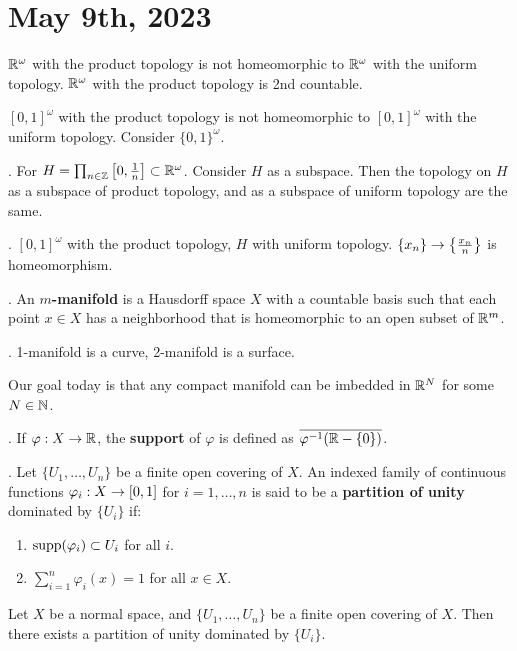 \section*{May 9th, 2023}

\rmk \(\mathbb{R}^\omega\) with the product topology is not homeomorphic to \(\mathbb{R}^\omega\) with the uniform topology. \(\mathbb{R}^\omega\) with the product topology is 2nd countable.

\([0, 1]^\omega\) with the product topology is not homeomorphic to \([0, 1]^\omega\) with the uniform topology. Consider \(\{0, 1\}^\omega\).

\claim. For \(H = \prod_{n \in \mathbb{Z}} \left[0, \frac{1}{n}\right] \subset \mathbb{R}^\omega\). Consider \(H\) as a subspace. Then the topology on \(H\) as a subspace of product topology, and as a subspace of uniform topology are the same.

\claim. \([0, 1]^\omega\) with the product topology, \(H\) with uniform topology. \(\left\{ x_n \right\} \rightarrow \left\{ \frac{x_n}{n} \right\}\) is homeomorphism.


.  An \textbf{\(m\)-manifold} is a Hausdorff space \(X\) with a countable basis such that each point \(x \in X\) has a neighborhood that is homeomorphic to an open subset of \(\mathbb{R}^m\).

\ex. 1-manifold is a curve, 2-manifold is a surface.

Our goal today is that any compact manifold can be imbedded in \(\mathbb{R}^N\) for some \(N \in \mathbb{N}\).

.  If \(\varphi : X \rightarrow \mathbb{R}\), the \textbf{support} of \(\varphi\) is defined as \(\overline{\varphi^{-1}(\mathbb{R} -\{0\})}\).

.  Let \(\{U_1, \dots, U_n\}\) be a finite open covering of \(X\). An indexed family of continuous functions \(\varphi_i: X \rightarrow [0, 1]\) for \(i = 1, \dots, n\) is said to be a \textbf{partition of unity} dominated by \(\{U_i\}\) if:
\begin{enumerate}
    \item  \(\operatorname{supp}(\varphi_i) \subset U_i\) for all \(i\).
    \item \(\sum_{i=1}^n \varphi_i(x) = 1\) for all \(x \in X\).
\end{enumerate}

 Let \(X\) be a normal space, and \(\{U_1, \dots, U_n\}\) be a finite open covering of \(X\). Then there exists a partition of unity dominated by \(\{U_i\}\).

